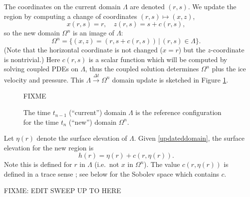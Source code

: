 \documentclass[letterpaper,final,12pt,reqno]{amsart}
\begin{document}
The coordinates on the current domain $\Lambda$ are denoted $(r,s)$.  We update the region by computing a change of coordinates $(r,s) \mapsto (x,z)$,
\begin{equation}
x(r,s)=r, \quad z(r,s)=s+c(r,s), \label{changecoords}
\end{equation}
so the new domain $\Omega^n$ is an image of $\Lambda$:
\begin{equation}
\Omega^n = \{(x,z)=(r,s+c(r,s)) \,\big|\, (r,s) \in \Lambda\}.  \label{updateddomain}
\end{equation}
(Note that the horizontal coordinate is not changed ($x=r$) but the $z$-coordinate is nontrivial.)  Here $c(r,s)$ is a scalar function which will be computed by solving coupled PDEs on $\Lambda$, thus the coupled solution determines $\Omega^n$ plus the ice velocity and pressure.  This $\Lambda \stackrel{\Delta t}{\to} \Omega^n$ domain update is sketched in Figure \ref{fig:domainupdate}.

\begin{figure}[h]

FIXME

\caption{The time $t_{n-1}$ (``current'') domain $\Lambda$ is the reference configuration for the time $t_n$ (``new'') domain $\Omega^n$.}
\label{fig:domainupdate}
\end{figure}

Let $\eta(r)$ denote the surface elevation of $\Lambda$.  Given \eqref{updateddomain}, the surface elevation for the new region is
\begin{equation}
h(r) = \eta(r) + c(r,\eta(r)).  \label{newsurfaceelevation}
\end{equation}
Note this is defined for $r$ in $\Lambda$ (i.e.~not $x$ in $\Omega^n$).  The value $c(r,\eta(r))$ is defined in a trace sense \cite{Evans2010}; see below for the Sobolev space which contains $c$.

FIXME: EDIT SWEEP UP TO HERE
\end{document}
